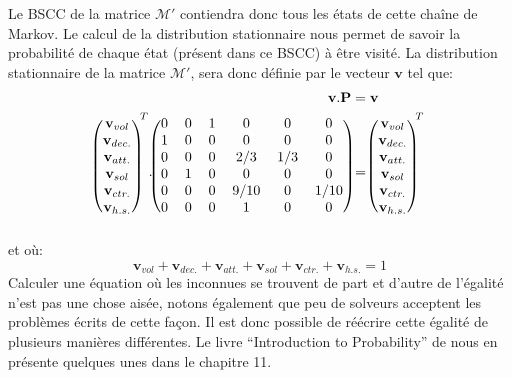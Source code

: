 \documentclass[letterpaper]{article}
\begin{document}
      Le BSCC de la matrice $\mathcal{M}'$ contiendra donc tous les états de cette 
      chaîne de Markov.  Le calcul de la distribution stationnaire nous permet
      de savoir la probabilité de chaque état (présent dans ce BSCC) à être visité.
      La distribution stationnaire de la matrice $\mathcal{M}'$, sera donc définie
      par le vecteur $\mathbf{v}$ tel que:
      \begin{align*}
	\mathbf{v} . \mathbf{P} &= \mathbf{v}\\
	\begin{blockarray}{(c)}
	  \mathbf{v}_{vol}\\
	  \mathbf{v}_{dec.}\\
	  \mathbf{v}_{att.}\\
	  \mathbf{v}_{sol}\\
	  \mathbf{v}_{ctr.}\\
	  \mathbf{v}_{h.s.}
	\end{blockarray}^T .
	\begin{blockarray}{(cccccc)}
	    0 & 0 & 1 & 0    & 0   & 0    \\
	    1 & 0 & 0 & 0    & 0   & 0    \\
	    0 & 0 & 0 & 2/3  & 1/3 & 0    \\
	    0 & 1 & 0 & 0    & 0   & 0    \\
	    0 & 0 & 0 & 9/10 & 0   & 1/10 \\
	    0 & 0 & 0 & 1    & 0   & 0    \\
	\end{blockarray}
	&= 
	\begin{blockarray}{(c)}
	  \mathbf{v}_{vol}\\
	  \mathbf{v}_{dec.}\\
	  \mathbf{v}_{att.}\\
	  \mathbf{v}_{sol}\\
	  \mathbf{v}_{ctr.}\\
	  \mathbf{v}_{h.s.}
	\end{blockarray}^T
      \end{align*}
      et où:
      $$\mathbf{v}_{vol} + \mathbf{v}_{dec.} + \mathbf{v}_{att.} + \mathbf{v}_{sol} + 
	\mathbf{v}_{ctr.} + \mathbf{v}_{h.s.} = 1$$
      Calculer une équation où les inconnues se trouvent de part et d'autre de l'égalité
      n'est pas une chose aisée, notons également que peu de solveurs acceptent les 
      problèmes écrits de cette façon.  Il est donc possible de réécrire cette égalité
      de plusieurs manières différentes.  Le livre  ``Introduction to Probability'' 
      de \cite{IP} nous en présente quelques unes dans le chapitre 11.
\end{document}
